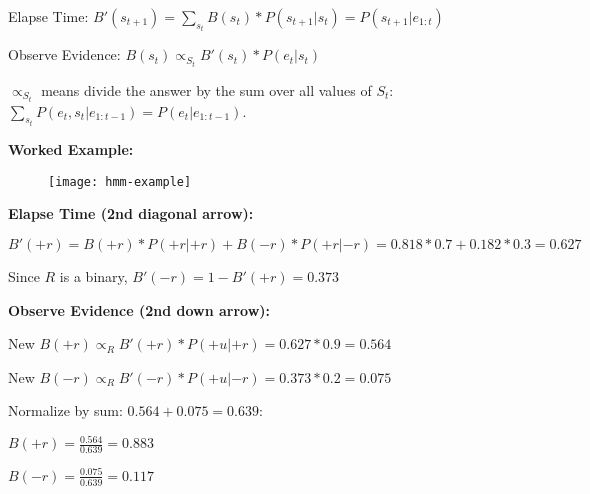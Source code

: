 Elapse Time: $B'(s_{t+1}) = \sum_{s_t}B(s_t) * P(s_{t+1} | s_t) = P(s_{t+1}|e_{1:t})$

Observe Evidence: $B(s_t) \propto_{S_t} B'(s_t) * P(e_t | s_t)$

$\propto_{S_t}$ means divide the answer by the sum over all values of $S_t$: $\sum_{s_t} P(e_t, s_t | e_{1:t-1}) = P(e_t | e_{1:t-1})$.

\textbf{Worked Example:}
\begin{figure}[H]
    \centering
    \texttt{[image: hmm-example]}
\end{figure}

\textbf{Elapse Time (2nd diagonal arrow):}

$B'(+r) = B(+r) * P(+r | +r) + B(-r) * P(+r | -r) = 0.818 * 0.7 + 0.182 * 0.3 = 0.627 $

Since $R$ is a binary, $B'(-r) = 1 - B'(+r) = 0.373$

\textbf{Observe Evidence (2nd down arrow):}

New $B(+r) \propto_{R}  B'(+r) * P(+u | +r) = 0.627 * 0.9 = 0.564$

New $B(-r) \propto_{R}  B'(-r) * P(+u | -r) = 0.373 * 0.2 = 0.075 $

Normalize by sum: $0.564 + 0.075 = 0.639$:

$B(+r) = \frac{0.564}{0.639} = 0.883$

$B(-r) = \frac{0.075}{0.639} = 0.117$

